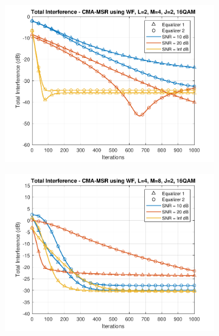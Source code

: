 \begin{figure}
\begin{subfigure}[b]{0.45\textwidth}
		\includegraphics[width=\linewidth]{./figs/BF_WF_MSR_TI_16QAM_L=2_M=4_J=2_K=1000.pdf}
		\label{fig:wf_msr_ti16_24}
	\end{subfigure}
	\begin{subfigure}[b]{0.45\textwidth}
		\includegraphics[width=\linewidth]{./figs/BF_WF_MSR_TI_16QAM_L=4_M=8_J=2_K=1000.pdf}
		\label{fig:wf_msr_ti16_48}
	\end{subfigure}
	\begin{subfigure}[b]{0.45\textwidth}

\end{subfigure}
\end{figure}
